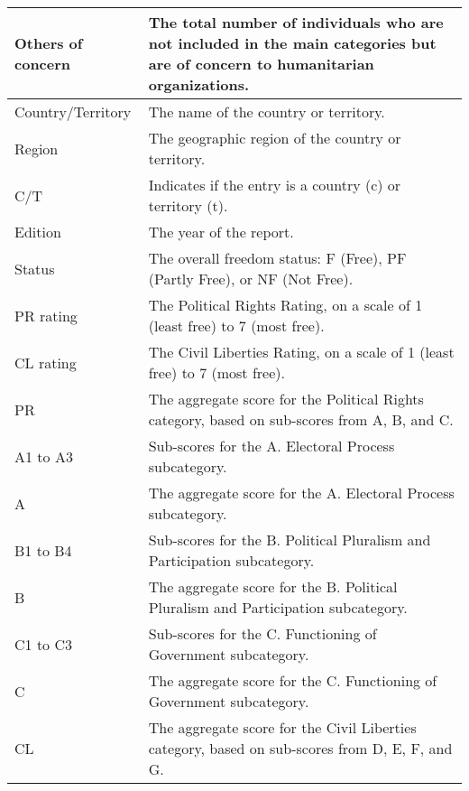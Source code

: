 \documentclass{article}
\theoremstyle{plain}
\theoremstyle{definition}
\theoremstyle{remark}
\begin{document}
\begin{table}[H]
\begin{center}
\begin{small}
\begin{tabular}{|p{}|p{}|}
Others of concern & The total number of individuals who are not included in the main categories but are of concern to humanitarian organizations. \\
\hline

Country/Territory & The name of the country or territory. \\
\hline

Region & The geographic region of the country or territory. \\
\hline

C/T & Indicates if the entry is a country (c) or territory (t). \\
\hline

Edition & The year of the report. \\
\hline

Status & The overall freedom status: F (Free), PF (Partly Free), or NF (Not Free). \\
\hline

PR rating & The Political Rights Rating, on a scale of 1 (least free) to 7 (most free). \\
\hline

CL rating & The Civil Liberties Rating, on a scale of 1 (least free) to 7 (most free). \\
\hline

PR & The aggregate score for the Political Rights category, based on sub-scores from A, B, and C. \\
\hline

A1 to A3 & Sub-scores for the A. Electoral Process subcategory. \\
\hline

A & The aggregate score for the A. Electoral Process subcategory. \\
\hline

B1 to B4 & Sub-scores for the B. Political Pluralism and Participation subcategory. \\
\hline

B & The aggregate score for the B. Political Pluralism and Participation subcategory. \\
\hline

C1 to C3 & Sub-scores for the C. Functioning of Government subcategory. \\
\hline

C & The aggregate score for the C. Functioning of Government subcategory. \\
\hline

CL & The aggregate score for the Civil Liberties category, based on sub-scores from D, E, F, and G. \\
\hline


\end{tabular}
\end{small}
\end{center}
\end{table}
\end{document}
